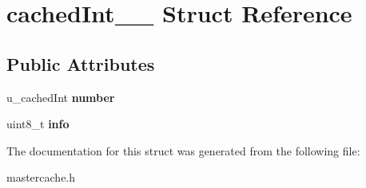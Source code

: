 \hypertarget{structcachedInt____}{}\section{cached\+Int\+\_\+\+\_\+ Struct Reference}
\label{structcachedInt____}
\subsection*{Public Attributes}
\begin{DoxyCompactItemize}
\item 
u\+\_\+cached\+Int {\bfseries number}\hypertarget{structcachedInt_____ae847b2fddcff89a9b7b9a5aa127cec9b}{}\label{structcachedInt_____ae847b2fddcff89a9b7b9a5aa127cec9b}

\item 
uint8\+\_\+t {\bfseries info}\hypertarget{structcachedInt_____a12c85d192562a6a2f3c52ad8d2d9bcb3}{}\label{structcachedInt_____a12c85d192562a6a2f3c52ad8d2d9bcb3}

\end{DoxyCompactItemize}


The documentation for this struct was generated from the following file\+:\begin{DoxyCompactItemize}
\item 
mastercache.\+h\end{DoxyCompactItemize}
